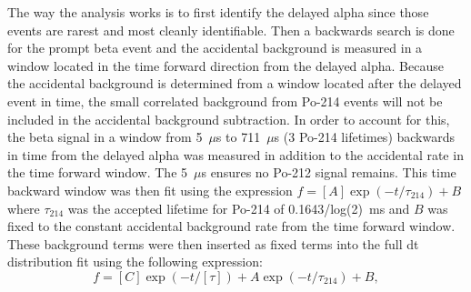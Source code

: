 The way the analysis works is to first identify the delayed alpha since those events are rarest and most cleanly identifiable. Then a backwards search is done for the prompt beta event and the accidental background is measured in a window located in the time forward direction from the delayed alpha. Because the accidental background is determined from a window located after the delayed event in time, the small correlated background from Po-214 events will not be included in the accidental background subtraction. In order to account for this, the beta signal in a window from 5~$\mu$s to 711~$\mu$s (3 Po-214 lifetimes) backwards in time from the delayed alpha  was measured in addition to the accidental rate in the time forward window. The 5~$\mu$s ensures no Po-212 signal remains. This time backward window was then fit using the expression $f=[A]\exp{(-t/\tau_{214})}+B$ where $\tau_{214}$ was the accepted lifetime for Po-214 of 0.1643/log(2)~ms and $B$ was fixed to the constant accidental background rate from the time forward window. These background terms were then inserted as fixed terms into the full dt distribution fit using the following expression:
\begin{equation}
f=[C]\exp{(-t/[\tau])}+A\exp{(-t/\tau_{214})}+B,
\label{eqn:fdecay}
\end{equation}
